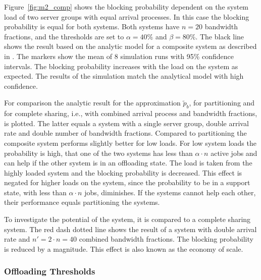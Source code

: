 Figure~\ref{fig:m2_comp} shows the blocking probability dependent on the system load of two server groups with equal arrival processes.
In this case the blocking probability is equal for both systems. Both systems have $n=20$ bandwidth fractions, and the thresholds are set to $\alpha=40\%$ and $\beta=80\%$.
The black line shows the result based on the analytic model for a composite system as described in .
The markers show the mean of 8 simulation runs with 95\% confidence intervals.
The blocking probability increases with the load on the system as expected.
The results of the simulation match the analytical model with high confidence.

For comparison the analytic result for the approximation $\tilde{p}_b$, for partitioning and for complete sharing, i.e., with combined arrival process and bandwidth fractions, is plotted.
The latter equals a system with a single server group, double arrival rate and double number of bandwidth fractions.
Compared to partitioning the composite system performs slightly better for low loads.
For low system loads the probability is high, that one of the two systems has less than $\alpha\cdot n$ active jobs and can help if the other system is in an offloading state.
The load is taken from the highly loaded system and the blocking probability is decreased.
This effect is negated for higher loads on the system, since the probability to be in a support state, with less than $\alpha\cdot n$ jobs, diminishes.
If the systems cannot help each other, their performance equals partitioning the systems.

To investigate the potential of the system, it is compared to a complete sharing system.
The red dash dotted line shows the result of a system with double arrival rate and $n'=2\cdot n=40$ combined bandwidth fractions. The blocking probability is reduced by a magnitude. This effect is also known as the economy of scale.


\subsubsection*{Offloading Thresholds}

